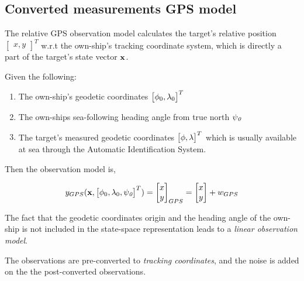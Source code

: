 \subsection{Converted measurements GPS model}


The relative GPS observation model calculates the target's relative position $\begin{bmatrix}x, y\end{bmatrix}^{T} $ w.r.t the own-ship's tracking coordinate system, which is directly a part of the target's state vector $\mathbf{x}$. 

Given the following:

\begin{enumerate}
\item The own-ship's geodetic coordinates $\begin{bmatrix}{\phi}_{0}, {\lambda}_{0} \end{bmatrix}^{T}$
\item The own-ships sea-following heading angle from true north ${\psi}_{\textit{0}}$
\item The target's measured geodetic coordinates $\begin{bmatrix}{\phi}, {\lambda}\end{bmatrix}^{T}$ which is usually available at sea through the Automatic Identification System.
\end{enumerate}

Then the observation model is,


\begin{equation}\label{eq:GPSobsvmode}
{{y}}_{GPS}(\mathbf{x},\begin{bmatrix}{\phi}_{0}, {\lambda}_{0}, {\psi}_{\textit{0}} \end{bmatrix}^{T}) = \begin{bmatrix}
x \\
y
\end{bmatrix}_{GPS} = \begin{bmatrix}
x \\
y
\end{bmatrix} + {w}_{GPS}
\end{equation}

The fact that the geodetic coordinates origin and the heading angle of the own-ship is not included in the state-space representation leads to a \emph{linear observation model}.

The observations are pre-converted to \emph{tracking coordinates}, and the noise is added on the the post-converted observations.

